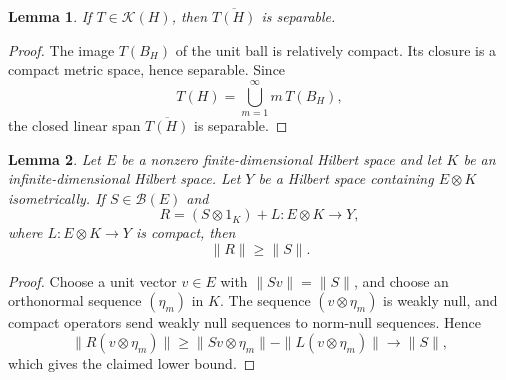 \documentclass[11pt]{article}
\newtheorem{lemma}{Lemma}
\newcommand{\Kcal}{\mathcal K}
\begin{document}
\begin{lemma}
\label{lem:separable-range}
If \(T\in \Kcal(H)\), then \(\overline{T(H)}\) is separable.
\end{lemma}

\begin{proof}
The image \(T(B_H)\) of the unit ball is relatively compact.  Its closure is a
compact metric space, hence separable.  Since
\[
        T(H)=\bigcup_{m=1}^\infty m\,T(B_H),
\]
the closed linear span \(\overline{T(H)}\) is separable.
\end{proof}

\begin{lemma}
\label{lem:matrix-compact-lower}
Let \(E\) be a nonzero finite-dimensional Hilbert space and let \(K\) be an
infinite-dimensional Hilbert space.  Let \(Y\) be a Hilbert space containing
\(E\otimes K\) isometrically.  If \(S\in\mathcal B(E)\) and
\[
        R=(S\otimes1_K)+L:E\otimes K\to Y,
\]
where \(L:E\otimes K\to Y\) is compact, then
\[
        \|R\|\ge \|S\|.
\]
\end{lemma}

\begin{proof}
Choose a unit vector \(v\in E\) with \(\|Sv\|=\|S\|\), and choose an
orthonormal sequence \((\eta_m)\) in \(K\).  The sequence
\((v\otimes\eta_m)\) is weakly null, and compact operators send weakly null
sequences to norm-null sequences.  Hence
\[
        \|R(v\otimes\eta_m)\|
        \ge \|Sv\otimes\eta_m\|-\|L(v\otimes\eta_m)\|
        \to \|S\|,
\]
which gives the claimed lower bound.
\end{proof}
\end{document}
